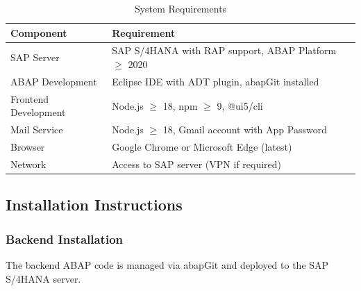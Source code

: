 \documentclass[12pt,a4paper]{report}
\begin{document}
\begin{table}[H]
\centering\small
\begin{tabularx}{\textwidth}{|l|X|}
  \hline
  \rowcolor{tableheadpeach}
  \textbf{Component} & \textbf{Requirement} \\ \hline
  SAP Server           & SAP S/4HANA with RAP support, ABAP Platform $\geq$ 2020 \\ \hline
  ABAP Development     & Eclipse IDE with ADT plugin, abapGit installed \\ \hline
  Frontend Development & Node.js $\geq$ 18, npm $\geq$ 9, @ui5/cli \\ \hline
  Mail Service         & Node.js $\geq$ 18, Gmail account with App Password \\ \hline
  Browser              & Google Chrome or Microsoft Edge (latest) \\ \hline
  Network              & Access to SAP server (VPN if required) \\ \hline
\end{tabularx}
\caption{System Requirements}
\label{tab:sys-requirements}
\end{table}

\subsection{Installation Instructions}

\subsubsection{Backend Installation}

The backend ABAP code is managed via abapGit and deployed to the SAP S/4HANA server.
\end{document}
